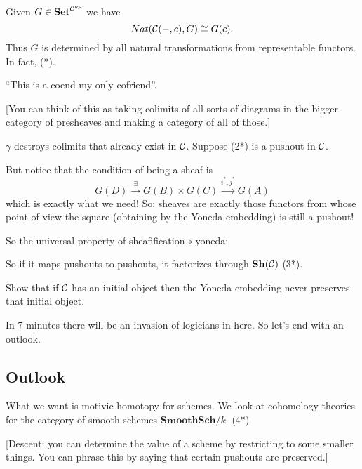 \documentclass[class=report, crop=false,a4paper,twoside]{standalone}
\begin{document}
\begin{center}
\end{center}

Given $G \in \mathbf{Set}^{\mathcal{C}^{op}}$ we have
\[
Nat(\mathcal{C}(-,c),G) \cong G(c).
\]
Thus $G$ is determined by all natural transformations from representable functors. In fact, (*).

``This is a coend my only cofriend''. 

[You can think of this as taking colimits of all sorts of diagrams in the bigger category of presheaves and making a category of all of those.] 

$\gamma$ destroys colimits that already exist in $\mathcal{C}$. Suppose (2*) is a pushout in $\mathcal{C}$. 

But notice that the condition of being a sheaf is
\[
G(D) \xrightarrow{\exists} G(B) \times G(C) \xrightarrow{i^*,j^*} G(A)
\]
which is exactly what we need! So: sheaves are exactly those functors from whose point of view the square (obtaining by the Yoneda embedding) is still a pushout!

So the universal property of sheafification $\circ$ yoneda:

So if it maps pushouts to pushouts, it factorizes through $\mathbf{Sh}(\mathcal{C})$ (3*). 

\begin{exercise}
Show that if $\mathcal{C}$ has an initial object then the Yoneda embedding never preserves that initial object. 	
\end{exercise}

In 7 minutes there will be an invasion of logicians in here. So let's end with an outlook.

\subsection{Outlook}
What we want is motivic homotopy for schemes. We look at cohomology theories for the category of smooth schemes $\mathbf{SmoothSch}/k$. (4*)

[Descent: you can determine the value of a scheme by restricting to some smaller things. You can phrase this by saying that certain pushouts are preserved.]
\end{document}
